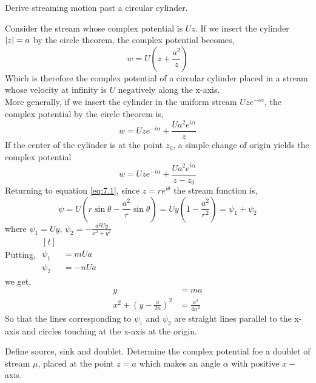 \documentclass[12pt]{article}
\begin{document}
\newpage
\begin{prob}
    Derive streaming motion past a circular cylinder.
\end{prob}
\begin{soln}
    Consider the stream whose complex potential is $ Uz $. If we insert the cylinder $ \left\vert z\right\vert=a $ by the circle theorem, the complex potential becomes,
    \begin{equation}
        \label{eq:7.1}
        w=U\left( z+\frac{a^2}{z} \right)
    \end{equation}
    Which is therefore the complex potential of a circular cylinder placed in a stream whose velocity at infinity is $ U $ negatively along the x-axis.\\
    More generally, if we insert the cylinder in the uniform stream $ Uze^{-i\alpha} $, the complex potential by the circle theorem is,
    \[
        w=Uze^{-i\alpha}+\frac{Ua^2e^{i\alpha}}{z}
    \]
    If the center of the cylinder is at the point $ z_0 $, a simple change of origin yields the complex potential 
    \[
        w=Uze^{-i\alpha}+\frac{Ua^2e^{i\alpha}}{z-z_0}
    \]
    Returning to equation \eqref{eq:7.1}, since $ z=re^{i\theta} $ the stream function is,
    \[
        \psi=U\left( r\sin \theta-\frac{a^2}{r}\sin \theta \right)=Uy\left( 1-\frac{a^2}{r^2}\right)=\psi_1+\psi_2 
    \]
    where $ \psi_1=Uy, \,\psi_2=-\frac{a^2Uy}{x^2+y^2}  $\\
    Putting, $ \begin{aligned}[t]
        &\\
        \psi_1&=mUa\\
        \psi_2&=-nUa
    \end{aligned} $\\
    we get,
    \begin{align*}
        y&=ma\\
        x^2+\left( y-\frac{a}{2n} \right)^2&=\frac{a^2}{4n^2}
    \end{align*}
    So that the lines corresponding to $ \psi_1 $ and $ \psi_2 $ are straight lines parallel to the x-axis and circles touching at the x-axis at the origin.
\end{soln}
\newpage
\begin{prob}
    Define source, sink and doublet. Determine the complex potential foe a doublet of stream $ \mu $, placed at the point $ z=a $ which makes an angle $ \alpha $ with positive $ x- $axis.
\end{prob}
\end{document}
